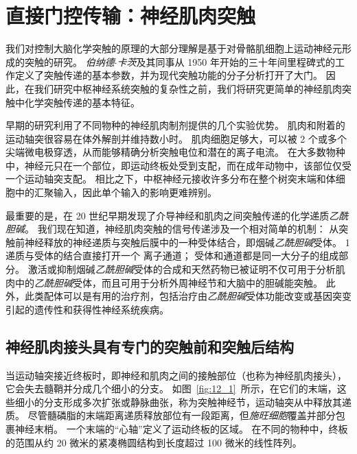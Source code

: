 \chapter{直接门控传输：神经肌肉突触} \label{chap:chap12}


我们对控制大脑化学突触的原理的大部分理解是基于对骨骼肌细胞上运动神经元形成的突触的研究。
\textit{伯纳德$\cdot$卡茨}及其同事从 1950 年开始的三十年间里程碑式的工作定义了突触传递的基本参数，并为现代突触功能的分子分析打开了大门。
因此，在我们研究中枢神经系统突触的复杂性之前，我们将研究更简单的神经肌肉突触中化学突触传递的基本特征。


早期的研究利用了不同物种的神经肌肉制剂提供的几个实验优势。
肌肉和附着的运动轴突很容易在体外解剖并维持数小时。
肌肉细胞足够大，可以被 2 个或多个尖端微电极穿透，从而能够精确分析突触电位和潜在的离子电流。
在大多数物种中，神经元只在一个部位，即运动终板处受到支配，而在成年动物中，该部位仅受一个运动轴突支配。
相比之下，中枢神经元接收许多分布在整个树突末端和体细胞中的汇聚输入，因此单个输入的影响更难辨别。


最重要的是，在 20 世纪早期发现了介导神经和肌肉之间突触传递的化学递质\textit{乙酰胆碱}。
我们现在知道，神经肌肉突触的信号传递涉及一个相对简单的机制：
从突触前神经释放的神经递质与突触后膜中的一种受体结合，即烟碱\textit{乙酰胆碱}受体。
1 递质与受体的结合直接打开一个 离子通道；
受体和通道都是同一大分子的组成部分。
激活或抑制烟碱\textit{乙酰胆碱}受体的合成和天然药物已被证明不仅可用于分析肌肉中的\textit{乙酰胆碱}受体，而且可用于分析外周神经节和大脑中的胆碱能突触。
此外，此类配体可以是有用的治疗剂，包括治疗由\textit{乙酰胆碱}受体功能改变或基因突变引起的遗传性和获得性神经系统疾病。



\section{神经肌肉接头具有专门的突触前和突触后结构}

当运动轴突接近终板时，即神经和肌肉之间的接触部位（也称为神经肌肉接头），它会失去髓鞘并分成几个细小的分支。
如图~\ref{fig:12_1}~所示，在它们的末端，这些细小的分支形成多次扩张或静脉曲张，称为突触神经节，运动轴突从中释放其递质。
尽管髓磷脂的末端距离递质释放部位有一段距离，但\textit{施旺细胞}覆盖并部分包裹神经末梢。
一个末端的“心轴”定义了运动终板的区域。
在不同的物种中，终板的范围从约 20 微米的紧凑椭圆结构到长度超过 100 微米的线性阵列。


